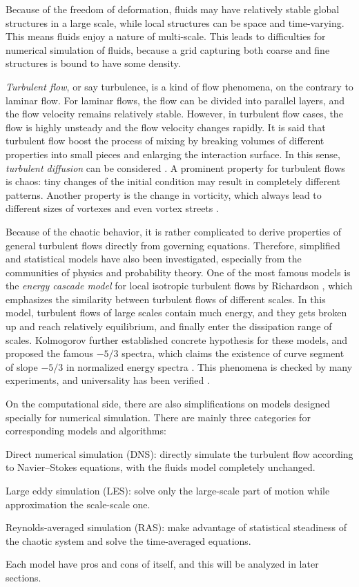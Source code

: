 \documentclass[english, nochinese]{pkupaper}
\begin{document}
Because of the freedom of deformation, fluids may have relatively stable global structures in a large scale, while local structures can be space and time-varying. This means fluids enjoy a nature of multi-scale. This leads to difficulties for numerical simulation of fluids, because a grid capturing both coarse and fine structures is bound to have some density.

\emph{Turbulent flow}, or say turbulence, is a kind of flow phenomena, on the contrary to laminar flow. For laminar flows, the flow can be divided into parallel layers, and the flow velocity remains relatively stable. However, in turbulent flow cases, the flow is highly unsteady and the flow velocity changes rapidly. It is said that turbulent flow boost the process of mixing by breaking volumes of different properties into small pieces and enlarging the interaction surface. In this sense, \emph{turbulent diffusion} can be considered \parencite{ferziger_computational_2002}. A prominent property for turbulent flows is chaos: tiny changes of the initial condition may result in completely different patterns. Another property is the change in vorticity, which always lead to different sizes of vortexes and even vortex streets \parencite{ferziger_computational_2002}.

Because of the chaotic behavior, it is rather complicated to derive properties of general turbulent flows directly from governing equations. Therefore, simplified and statistical models have also been investigated, especially from the communities of physics and probability theory. One of the most famous models is the \emph{energy cascade model} for local isotropic turbulent flows by Richardson \parencite{taylor_diffusion_nodate}, which emphasizes the similarity between turbulent flows of different scales. In this model, turbulent flows of large scales contain much energy, and they gets broken up and reach relatively equilibrium, and finally enter the dissipation range of scales. Kolmogorov further established concrete hypothesis for these models, and proposed the famous $ -5 / 3 $ spectra, which claims the existence of curve segment of slope $ -5 / 3 $ in normalized energy spectra \parencite{kolmogorov_equations_1941}. This phenomena is checked by many experiments, and universality has been verified \parencite{sreenivasan_universality_1995}.

On the computational side, there are also simplifications on models designed specially for numerical simulation. There are mainly three categories for corresponding models and algorithms:
\begin{partlist}
\item Direct numerical simulation (DNS): directly simulate the turbulent flow according to Navier--Stokes equations, with the fluids model completely unchanged.
\item Large eddy simulation (LES): solve only the large-scale part of motion while approximation the scale-scale one.
\item Reynolds-averaged simulation (RAS): make advantage of statistical steadiness of the chaotic system and solve the time-averaged equations.
\end{partlist}
Each model have pros and cons of itself, and this will be analyzed in later sections.
\end{document}
